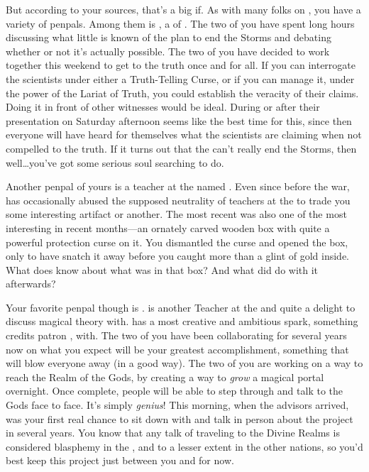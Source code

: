 \documentclass[char]{GL2020}
\begin{document}
But according to your sources, that's a big if. As with many folks on \pEarth{}, you have a variety of penpals. Among them is \cHedonist{\full}, a \cHedonist{\cleric} of \cFarmGod{}. The two of you have spent long hours discussing what little is known of the \pTech{} plan to end the Storms and debating whether or not it's actually possible. The two of you have decided to work together this weekend to get to the truth once and for all. If you can interrogate the scientists under either a Truth-Telling Curse, or if you can manage it, under the power of the Lariat of Truth, you could establish the veracity of their claims. Doing it in front of other witnesses would be ideal. During or after their presentation on Saturday afternoon seems like the best time for this, since then everyone will have heard for themselves what the scientists are claiming when not compelled to the truth. If it turns out that the \pTech{} can't really end the Storms, then well\ldots{}you've got some serious soul searching to do.

Another penpal of yours is a teacher at the \pSc{} named \cChupSecond{\full}. Even since before the war, \cChupSecond{} has occasionally abused the supposed neutrality of teachers at the \pSc{} to trade you some interesting artifact \cChupSecond{\they} \cChupSecond{\have} or another. The most recent was also one of the most interesting in recent months---an ornately carved wooden box with quite a powerful protection curse on it. You dismantled the curse and opened the box, only to have \cChupSecond{} snatch it away before you caught more than a glint of gold inside. What does \cChupSecond{} know about what was in that box? And what did \cChupSecond{\they} do with it afterwards?

Your favorite penpal though is \cFlowPriest{\full}. \cFlowPriest{} is another Teacher at the \pSchool{} and quite a delight to discuss magical theory with. \cFlowPriest{} has a most creative and ambitious spark, something \cFlowPriest{\they} credits \cFlowPriest{\their} patron \cFlow{\God}, \cFlowFull{\full} with. The two of you have been collaborating for several years now on what you expect will be your greatest accomplishment, something that will blow everyone away (in a good way). The two of you are working on a way to reach the Realm of the Gods, by creating a way to \emph{grow} a magical portal overnight. Once complete, people will be able to step through and talk to the Gods face to face. It's simply \emph{genius}! This morning, when the advisors arrived, was your first real chance to sit down with \cFlowPriest{} and talk in person about the project in several years. You know that any talk of traveling to the Divine Realms is considered blasphemy in the \pFarm{}, and to a lesser extent in the other nations, so you'd best keep this project just between you and \cFlowPriest{} for now.
\end{document}
